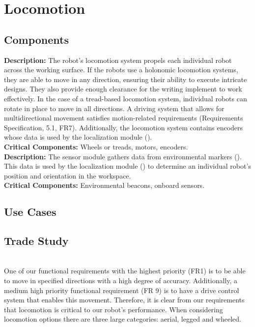 
\section{Locomotion}
\label{sec:locomotion}

\subsection{Components}

\textbf{Description:} The robot's locomotion system propels each individual robot across the working surface. If the robots use a holonomic locomotion systems, they are able to move in any direction, ensuring their ability to execute intricate designs. They also provide enough clearance for the writing implement to work effectively. In the case of a tread-based locomotion system, individual robots can rotate in place to move in all directions. A driving system that allows for multidirectional movement satisfies motion-related requirements (Requirements Specification, 5.1, FR7). Additionally, the locomotion system contains encoders whose data is used by the localization module (). \\
\textbf{Critical Components:} Wheels or treads, motors, encoders. \\

\label{sec:subsystem_sensors}
\textbf{Description:} The sensor module gathers data from environmental markers (). This data is used by the localization module () to determine an individual robot's position and orientation in the workspace. \\
\textbf{Critical Components:} Environmental beacons, onboard sensors. \\

\subsection{Use Cases}

\subsection{Trade Study}
\label{sec:trade_locomotion}
 \\
One of our functional requirements with the highest priority (FR1) is to be able to move in specified directions with a high degree of accuracy. Additionally, a medium high priority functional requirement (FR 9) is to have a drive control system that enables this movement. Therefore, it is clear from our requirements that locomotion is critical to our robot's performance. When considering locomotion options there are three large categories: aerial, legged and wheeled. 

